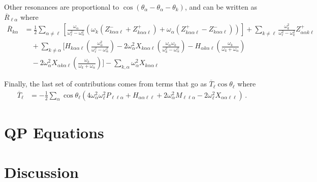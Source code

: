 \documentclass[letterpaper,11pt]{article}
\newcommand{\ok}{\omega_k}
\newcommand{\ol}{\omega_\ell}
\newcommand{\thk}{\theta_k}
\newcommand{\oal}{\omega_\alpha}
\begin{document}
Other resonances are proportional to $\cos \left( \theta_\alpha - \theta_\alpha - \thk \right)$, and can be written as $\overline{R}_{\ell \alpha}$ where
\begin{align}
\overline{R}_{k \alpha} &= \frac{1}{2} \sum_{\alpha \neq \ell} \left[ \frac{\oal}{\ol^2 - \oal^2} \left( \ok (Z^{-}_{k \alpha \alpha \ell} + Z^{+}_{k \alpha \alpha \ell} ) + \oal (Z^{+}_{k \alpha \alpha \ell} - Z^{-}_{k \alpha \alpha \ell} ) \right) \right]  + \sum_{k \neq \ell} \frac{\ok^2}{\ol^2 - \ok^2} Z^{+}_{\alpha \alpha k \ell} \nonumber \\
%
& \quad + \sum_{k \neq \alpha} \bigg[ H_{k \alpha \alpha \ell} \left( \frac{\oal^2}{\ol^2 - \oal^2} \right) - 2 \oal^2 X_{k \alpha \alpha \ell} \left( \frac{\oal \ok}{\ok^2 - \oal^2} \right) - H_{\alpha k \alpha \ell} \left( \frac{\ok}{\ok + \oal} \right) \nonumber \\
%
& \quad  - 2 \oal^2 X_{\alpha k \alpha \ell} \left( \frac{\ok}{\ok + \oal} \right) \bigg] - \sum_{k, \alpha} \oal^2 X_{k \alpha \alpha \ell}
\end{align}

Finally, the last set of contributions comes from terms that go as $\overline{T}_\ell \cos \theta_\ell$ where
\begin{align}
\overline{T}_\ell &= - \frac{1}{2} \sum_\alpha \cos \theta_\ell \left( 4 \oal^2 \ol^2 P_{\ell \ell \alpha} + H_{\alpha \alpha \ell \ell} + 2 \oal^2 M_{\ell \ell \alpha} - 2 \ol^2 X_{\alpha \alpha \ell \ell} \right) \, .
\end{align}



\section{QP Equations}


\section{Discussion}



\end{document}
